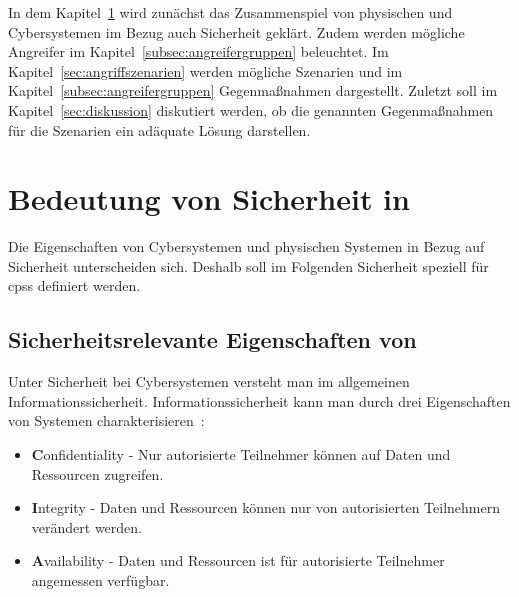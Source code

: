 \documentclass[final,bibliography=totocnumbered]{include/sikseminar}
\newcommand{\fb}[1]{\dofb#1}
\newcommand{\cps}{\glspl{cps}\xspace}
\newcommand{\dofb}[1]{\textbf{#1}\nobreak\hspace{0pt}}
\begin{document}
In dem Kapitel~\ref{sec:bedeutung-sicherheit} wird zunächst das Zusammenspiel von physischen und Cybersystemen im Bezug auch Sicherheit geklärt.
Zudem werden mögliche Angreifer im Kapitel~\ref{subsec:angreifergruppen} beleuchtet.
Im Kapitel~\ref{sec:angriffszenarien} werden mögliche Szenarien und im Kapitel~\ref{subsec:angreifergruppen} Gegenmaßnahmen dargestellt.
Zuletzt soll im Kapitel~\ref{sec:diskussion} diskutiert werden, ob die genannten Gegenmaßnahmen für die Szenarien ein adäquate Lösung darstellen.

\section{Bedeutung von Sicherheit in }\label{sec:bedeutung-sicherheit}

Die Eigenschaften von Cybersystemen und physischen Systemen in Bezug auf Sicherheit unterscheiden sich.
Deshalb soll im Folgenden Sicherheit speziell für \cps definiert werden.

\subsection{Sicherheitsrelevante Eigenschaften von }\label{subsec:definition}
Unter Sicherheit bei Cybersystemen versteht man im allgemeinen Informationssicherheit.
Informationssicherheit kann man durch drei Eigenschaften von Systemen charakterisieren~\cite{CH13}:
\begin{itemize}[noitemsep,wide=0pt]
    \item \fb{Confidentiality} - Nur autorisierte Teilnehmer können auf Daten und Ressourcen zugreifen.\label{def:confidentiality}
    \item \fb{Integrity} - Daten und Ressourcen können nur von autorisierten Teilnehmern verändert werden.\label{def:integrity}
    \item \fb{Availability} - Daten und Ressourcen ist für autorisierte Teilnehmer angemessen verfügbar.\label{def:availability}
\end{itemize}
\end{document}
